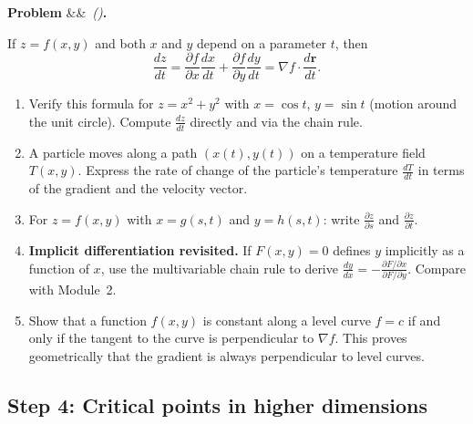 \documentclass[12pt, a4paper]{article}
\newcounter{problem}
\newenvironment{problem}[1][]{%
  \refstepcounter{problem}%
  \par\vspace{6pt}%
  \noindent\textbf{\color{MidBlue}Problem \theproblem}%
  \ifx&#1&\else\ \textit{(#1)}\fi\textbf{.}\enskip
}{\par\vspace{4pt}}
\begin{document}
\begin{problem}
\label{prob:chain_multi}
If $z = f(x,y)$ and both $x$ and $y$ depend on a parameter $t$, then
\[
  \frac{dz}{dt} = \frac{\partial f}{\partial x}\frac{dx}{dt} + \frac{\partial f}{\partial y}\frac{dy}{dt} = \nabla f \cdot \frac{d\mathbf{r}}{dt}.
\]
\begin{enumerate}[label=(\alph*), topsep=2pt]
  \item Verify this formula for $z = x^2 + y^2$ with $x = \cos t$, $y = \sin t$ (motion around the unit circle). Compute $\frac{dz}{dt}$ directly and via the chain rule.
  \item A particle moves along a path $(x(t), y(t))$ on a temperature field $T(x,y)$. Express the rate of change of the particle's temperature $\frac{dT}{dt}$ in terms of the gradient and the velocity vector.
  \item For $z = f(x,y)$ with $x = g(s,t)$ and $y = h(s,t)$: write $\frac{\partial z}{\partial s}$ and $\frac{\partial z}{\partial t}$.
  \item \textbf{Implicit differentiation revisited.} If $F(x,y) = 0$ defines $y$ implicitly as a function of $x$, use the multivariable chain rule to derive $\frac{dy}{dx} = -\frac{\partial F/\partial x}{\partial F/\partial y}$. Compare with Module~2.
  \item Show that a function $f(x,y)$ is constant along a level curve $f = c$ if and only if the tangent to the curve is perpendicular to $\nabla f$. This proves geometrically that the gradient is always perpendicular to level curves.
\end{enumerate}
\end{problem}

\subsection{Step 4: Critical points in higher dimensions}
\end{document}
